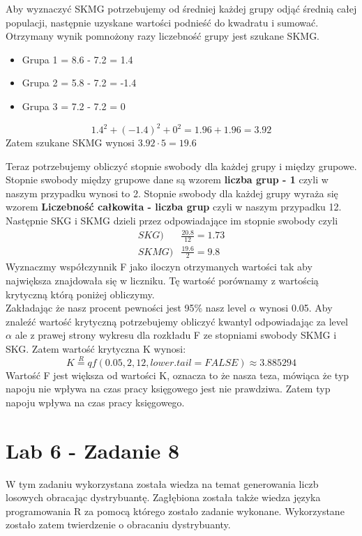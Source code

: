\documentclass{article}
\begin{document}
{Aby wyznaczyć SKMG potrzebujemy od średniej każdej grupy odjąć średnią całej populacji, następnie uzyskane wartości podnieść do kwadratu i sumować. Otrzymany wynik pomnożony razy liczebność grupy jest szukane SKMG.
\begin{itemize}
\item Grupa 1 = 8.6 - 7.2 = 1.4
\item Grupa 2 = 5.8 - 7.2 = -1.4
\item Grupa 3 = 7.2 - 7.2 = 0
\end{itemize}
\[
1.4^2 + (-1.4)^2 + 0^2 = 1.96 + 1.96 = 3.92
\]
Zatem szukane SKMG wynosi $3.92 \cdot 5 = 19.6$ \\ \par
Teraz potrzebujemy obliczyć stopnie swobody dla każdej grupy i między grupowe. Stopnie swobody między grupowe dane są wzorem \textbf{liczba grup - 1} czyli w naszym przypadku wynosi to 2. Stopnie swobody dla każdej grupy wyraża się wzorem \textbf{Liczebność całkowita - liczba grup} czyli w naszym przypadku 12. \\
Następnie SKG i SKMG dzieli przez odpowiadające im stopnie swobody czyli
\begin{align*}
SKG)& \frac{20.8}{12} = 1.73 \\
SKMG) & \frac{19.6}{2} = 9.8
\end{align*}
Wyznaczmy współczynnik F jako iloczyn otrzymanych wartości tak aby największa znajdowała się w liczniku. Tę wartość porównamy z wartością krytyczną którą poniżej obliczymy. \\
Zakładając że nasz procent pewności jest 95\% nasz level $\alpha$ wynosi 0.05. Aby znaleźć wartość krytyczną potrzebujemy obliczyć kwantyl odpowiadając za level $\alpha$ ale z prawej strony wykresu dla rozkładu F ze stopniami swobody SKMG i SKG. Zatem wartość krytyczna K wynosi:
\[
K \overset{R}{=} qf(0.05, 2, 12, lower.tail = FALSE) \approx 3.885294
\]
Wartość F jest większa od wartości K, oznacza to że nasza teza, mówiąca że typ napoju nie wpływa na czas pracy księgowego jest nie prawdziwa. Zatem typ napoju wpływa na czas pracy księgowego.

\section{Lab 6 - Zadanie 8}
W tym zadaniu wykorzystana została wiedza na temat generowania liczb losowych obracając dystrybuantę. Zagłębiona została także wiedza języka programowania R za pomocą którego zostało zadanie wykonane. Wykorzystane zostało zatem twierdzenie o obracaniu dystrybuanty.\\ \par

}
\end{document}
